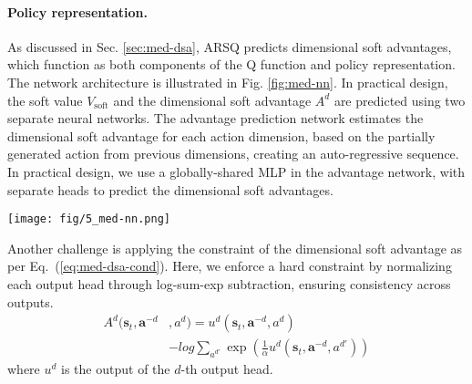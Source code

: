 \paragraph{Policy representation.}
As discussed in Sec. \ref{sec:med-dsa}, ARSQ predicts dimensional soft advantages, which function as both components of the Q function and policy representation. 
The network architecture is illustrated in Fig. \ref{fig:med-nn}.
In practical design, the soft value $V_{\text{soft}}$ and the dimensional soft advantage $A^d$ are predicted using two separate neural networks. 
The advantage prediction network estimates the dimensional soft advantage for each action dimension, based on the partially generated action from previous dimensions, creating an auto-regressive sequence. 
In practical design, we use a globally-shared MLP in the advantage network, with separate heads to predict the dimensional soft advantages.

\begin{figure*}[ht]
    \centering
    \texttt{[image: fig/5\_med-nn.png]}
    \vspace{-2em}
    \caption{Network architecture of ARSQ. The soft value $V_{\text{soft}}$ and the dimensional soft advantage $A^d$ are predicted by two separate networks. The advantage network utilizes a shared backbone, and advantage constraints are applied to its output.}
    \label{fig:med-nn}
\end{figure*}

Another challenge is applying the constraint of the dimensional soft advantage as per Eq.~(\ref{eq:med-dsa-cond}). 
Here, we enforce a hard constraint by normalizing each output head through log-sum-exp subtraction, ensuring consistency across outputs.
\begin{equation}
\label{eq:med-alg-cons}
\begin{aligned}
    A^d(\mathbf{s}_t, \mathbf{a}^{-d} &, a^d) 
    = u^d(\mathbf{s}_t, \mathbf{a}^{-d}, a^d) \\
    & - log \sum_{a^{d'}} \exp \left(
    \frac{1}{\alpha} u^d(\mathbf{s}_t, \mathbf{a}^{-d}, a^{d'})
    \right)
\end{aligned}
\end{equation}
where $u^d$ is the output of the $d$-th output head.

